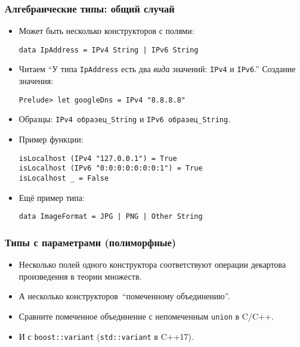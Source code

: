 \documentclass[10pt]{beamer}
\begin{document}
\begin{frame}[fragile]
\frametitle{Алгебраические типы: общий случай}
\begin{itemize}
    \item Может быть несколько конструкторов с полями:
\begin{lstlisting}[basicstyle=\ttfamily\small]
data IpAddress = IPv4 String | IPv6 String
\end{lstlisting}
\item Читаем \enquote{У типа \lstinline|IpAddress| есть два \emph{вида} значений: \lstinline|IPv4| и \lstinline|IPv6|.} Создание значения:
\begin{lstlisting}[basicstyle=\ttfamily\small]
Prelude> let googleDns = IPv4 "8.8.8.8"
\end{lstlisting}
\item Образцы: \lstinline|IPv4 образец_String| и \lstinline|IPv6 образец_String|.
\item Пример функции:
\begin{lstlisting}[basicstyle=\ttfamily\small]
isLocalhost (IPv4 "127.0.0.1") = True
isLocalhost (IPv6 "0:0:0:0:0:0:0:1") = True
isLocalhost _ = False
\end{lstlisting}
\pause
\item Ещё пример типа:
\begin{lstlisting}[basicstyle=\ttfamily\small]
data ImageFormat = JPG | PNG | Other String
\end{lstlisting}
\end{itemize}
\end{frame}

\begin{frame}[fragile]
\frametitle{Типы с параметрами (полиморфные)}
\begin{itemize}
    \item Несколько полей одного конструктора соответствуют операции декартова произведения в теории множеств.
    \item А несколько конструкторов\pause\ \enquote{помеченному объединению}.
    \item Сравните помеченное объединение с непомеченным \lstinline|union| в C/C++.
    \item И с \lstinline|boost::variant| (\lstinline|std::variant| в C++17).
\end{itemize}
\end{frame}
\end{document}

